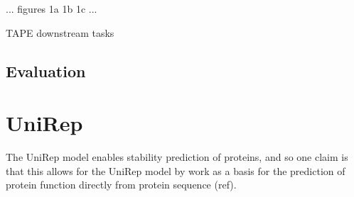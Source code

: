\documentclass[a4paper,11pt]{article}
\begin{document}
... figures 1a 1b 1c ...

TAPE downstream tasks

\subsection{Evaluation}

\section*{UniRep}
The UniRep model \cite{alley2019unified} enables stability prediction of proteins, and so one claim is that this allows for the UniRep model by work as a basis for the prediction of protein function directly from protein sequence (ref).

\clearpage
\printbibliography[title={References}]
\end{document}
